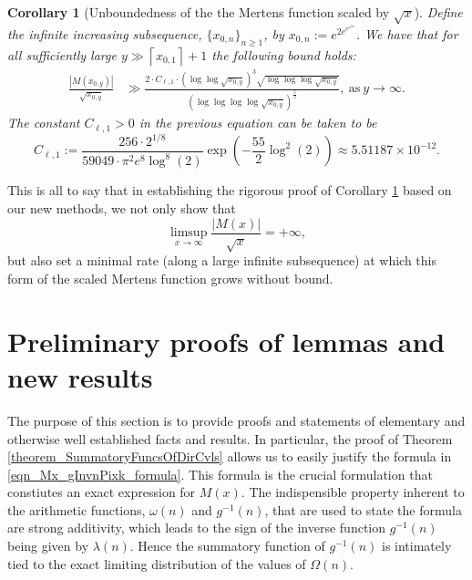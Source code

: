 \documentclass[11pt,reqno,a4letter]{article}
\numberwithin{figure}{section}
\numberwithin{table}{section}
\newcommand{\floor}[1]{\left\lfloor #1 \right\rfloor}
\newcommand{\ceiling}[1]{\left\lceil #1 \right\rceil}
\theoremstyle{plain}
\newtheorem{cor}[theorem]{Corollary}
\numberwithin{theorem}{section}
\theoremstyle{definition}
\newcommand{\SuccSim}[0]{\overset{_{\scriptsize{\blacktriangle}}}{\succsim}}
\renewcommand{\SuccSim}[0]{\ensuremath{\gg}}
\begin{document}
\begin{cor}[Unboundedness of the the Mertens function scaled by $\sqrt{x}$] 
\label{cor_ThePipeDreamResult_v1} 
Define the infinite increasing subsequence, 
$\{x_{0,n}\}_{n \geq 1}$, by $x_{0,n} := e^{2e^{e^{e^{2n}}}}$. 
We have that for all sufficiently large 
$y \gg \ceiling{x_{0,1}}+1$ the following bound holds: 
\begin{align*} 
\frac{|M(x_{0,y})|}{\sqrt{x_{0,y}}} & \SuccSim 
     \frac{2 \cdot C_{\ell, 1} \cdot (\log\log \sqrt{x_{0,y}})^{3} \sqrt{\log\log\log \sqrt{x_{0,y}}}}{ 
     (\log\log\log\log \sqrt{x_{0,y}})^{\frac{5}{2}}}, \mathrm{\ as\ } y \rightarrow \infty. 
\end{align*} 
The constant $C_{\ell,1} > 0$ in the previous equation can be taken to be 
\[
C_{\ell,1} := 
     \frac{256 \cdot 2^{1/8}}{59049 \cdot \pi^2 e^8 \log^8(2)} 
     \exp\left(-\frac{55}{2} \log^2(2)\right) 
     \approx 5.51187 \times 10^{-12}. 
\]
\end{cor} 

This is all to say that in establishing the rigorous proof of 
Corollary \ref{cor_ThePipeDreamResult_v1} 
based on our new methods, we not only show that 
\[
\limsup_{x \rightarrow \infty} \frac{|M(x)|}{\sqrt{x}} = +\infty, 
\]
but also set a minimal rate (along a large infinite subsequence) at which this form of the 
scaled Mertens function grows without bound. 


\newpage 
\section{Preliminary proofs of lemmas and new results} 
\label{Section_PrelimProofs_Config} 

The purpose of this section is to provide proofs and statements 
of elementary and otherwise well established facts and results. In particular, the proof of 
Theorem \ref{theorem_SummatoryFuncsOfDirCvls} allows us to easily justify the formula in 
\eqref{eqn_Mx_gInvnPixk_formula}. 
This formula is the crucial formulation that constiutes an exact expression for $M(x)$. 
The indispensible property inherent to the arithmetic functions, $\omega(n)$ and $g^{-1}(n)$, 
that are used to state the formula are strong additivity, which leads to the sign of the inverse function 
$g^{-1}(n)$ being given by $\lambda(n)$. Hence the summatory function of $g^{-1}(n)$ is 
intimately tied to the exact limiting 
distribution of the values of $\Omega(n)$. 
\end{document}
